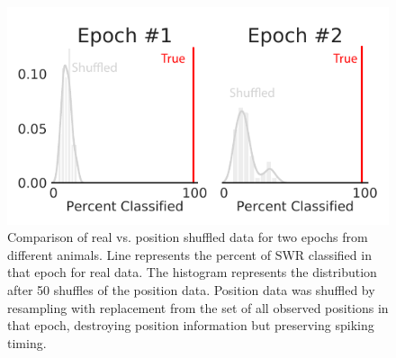 \documentclass[times, twoside]{zHenriquesLab-StyleBioRxiv}
\begin{document}
\begin{figure}%
\centering
\includegraphics[width=0.80\linewidth]{figures/Figure3-supplemental2/Figure3_v1-supplemental2}
\caption{Comparison of real vs. position shuffled data for two epochs from different animals. Line represents the percent of SWR classified in that epoch for real data. The histogram represents the distribution after 50 shuffles of the position data. Position data was shuffled by resampling with replacement from the set of all observed positions in that epoch, destroying position information but preserving spiking timing.}
\label{Figure3-Figure supplement 2}
\end{figure}

\end{document}
